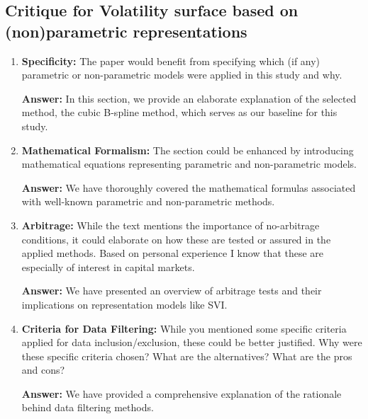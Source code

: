 \subsection{Critique for Volatility surface based on (non)parametric representations}
\begin{enumerate}
\item \textbf{Specificity:} The paper would benefit from specifying which (if any) parametric or non-parametric models were applied in this study and why.

\textbf{Answer:}
In this section, we provide an elaborate explanation of the selected method, the cubic B-spline method, which serves as our baseline for this study.

\item \textbf{Mathematical Formalism:} The section could be enhanced by introducing mathematical equations representing parametric and non-parametric models. 

\textbf{Answer:}
We have thoroughly covered the mathematical formulas associated with well-known parametric and non-parametric methods.

\item \textbf{Arbitrage:} While the text mentions the importance of no-arbitrage conditions, it could elaborate on how these are tested or assured in the applied methods. Based on personal experience I know that these are especially of interest in capital markets. 

\textbf{Answer:}
We have presented an overview of arbitrage tests and their implications on representation models like SVI.

\item \textbf{Criteria for Data Filtering:} While you mentioned some specific criteria applied for data inclusion/exclusion, these could be better justified. Why were these specific criteria chosen? What are the alternatives? What are the pros and cons?

\textbf{Answer:}
We have provided a comprehensive explanation of the rationale behind data filtering methods.

\end{enumerate}

